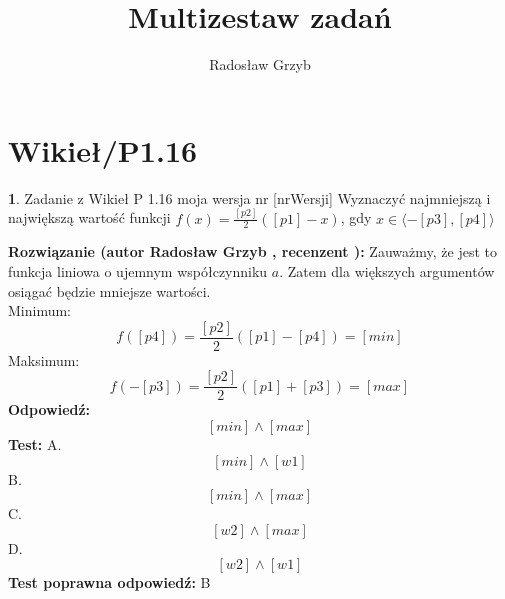 \documentclass[12pt, a4paper]{article}
\title{Multizestaw zadań}
\author{Radosław Grzyb}
\date{}
\theoremstyle{definition} %
\newtheorem{zad}{}
\newcommand{\kategoria}[1]{\section{#1}} %
\newcommand{\zadStart}[1]{\begin{zad}#1\newline} %
\newcommand{\zadStop}{\end{zad}}   %
\newcommand{\rozwStart}[2]{\noindent \textbf{Rozwiązanie (autor #1 , recenzent #2): }\newline} %
\newcommand{\rozwStop}{\newline}                                            %
\newcommand{\odpStart}{\noindent \textbf{Odpowiedź:}\newline}    %
\newcommand{\odpStop}{\newline}                                             %
\newcommand{\testStart}{\noindent \textbf{Test:}\newline} %
\newcommand{\testStop}{\newline} %
\newcommand{\kluczStart}{\noindent \textbf{Test poprawna odpowiedź:}\newline} %
\newcommand{\kluczStop}{\newline} %
\begin{document}
\maketitle
\kategoria{Wikieł/P1.16}
\zadStart{Zadanie z Wikieł P 1.16 moja wersja nr [nrWersji]}
Wyznaczyć najmniejszą i największą wartość funkcji $f(x)=\frac{[p2]}{2}([p1]-x)$, gdy $x\in\langle-[p3],[p4]\rangle$
\zadStop
\rozwStart{Radosław Grzyb}{}
Zauważmy, że jest to funkcja liniowa o ujemnym współczynniku $a$. Zatem dla większych argumentów osiągać będzie mniejsze wartości.\\
Minimum:
$$f([p4])=\frac{[p2]}{2}([p1]-[p4])=[min]$$
Maksimum:
$$f(-[p3])=\frac{[p2]}{2}([p1]+[p3])=[max]$$
\rozwStop
\odpStart
$$[min] \wedge [max]$$
\odpStop
\testStart
A.$$[min] \wedge [w1]$$
B.$$[min] \wedge [max]$$
C.$$[w2] \wedge [max]$$
D.$$[w2] \wedge [w1]$$
\testStop
\kluczStart
B
\kluczStop
\end{document}
